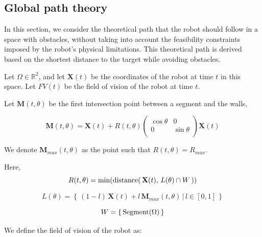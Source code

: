 \documentclass[../main.tex]{subfiles}
\begin{document}
\subsection{Global path theory}
In this section, we consider the theoretical path that the robot should follow in a space with obstacles, without taking into account the feasibility constraints imposed by the robot's physical limitations. This theoretical path is derived based on the shortest distance to the target while avoiding obstacles.

\vspace{1em}

Let $\Omega \in \mathbb{R}^{2}$, and let $\mathbf{X}(t)$ be the coordinates of the robot at time $t$ in this space.
\vspace{0.5em}
Let $FV(t)$ be the field of vision of the robot at time $t$.
\vspace{0.5em}

Let $\mathbf{M}(t, \theta)$ be the first intersection point between a segment and the walls,
\vspace{0.5em}

\begin{equation*}
	\displaystyle
	\mathbf{M}(t, \theta) = \mathbf{X}(t) + R(t, \theta) 
	\begin{pmatrix}
		\cos \theta & 0\\
		0 & \sin \theta\\
	\end{pmatrix} 
	\mathbf{X}(t)
\end{equation*}

We denote $\mathbf{M}_{max} (t, \theta)$ as the point such that $R(t, \theta) = R_{max}$.
\vspace{0.5em}

Here,
\begin{equation*}
	\displaystyle
	R(t, \theta) = \min (\text{\rmfamily distance}( \, \mathbf{X}(t), \, L(\theta) \cap W \,))
\end{equation*}

\begin{equation*}
	\displaystyle
	L(\theta) = \left\{ \, (1 - l) \, \mathbf{X}(t) + l\, \mathbf{M}_{max}(t, \theta) \,|\, l \in [0, 1]\, \right\}
\end{equation*}

\begin{equation*}
	\displaystyle
	W = \left\{ \, \text{\rmfamily Segment} (\Omega)\, \right\}
\end{equation*}

We define the field of vision of the robot as:
\end{document}
